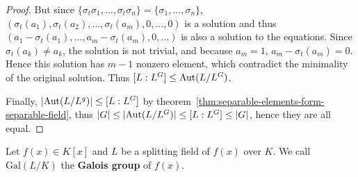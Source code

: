 \begin{theorem}
\begin{proof}
    But since $\{\sigma_t \sigma_1, \dots, \sigma_t \sigma_n\} = \{\sigma_1, \dots, \sigma_n\}$,
    $(\sigma_t(a_1), \sigma_t(a_2), \dots, \sigma_t(a_m), 0, \dots, 0)$ is a solution
    and thus $(a_1 - \sigma_t(a_1), \dots, a_m - \sigma_t(a_m), 0, \dots)$ is also a solution to the equations.
    Since $\sigma_t(a_k) \neq a_k$, the solution is not trivial, and because $a_m = 1$, $a_m - \sigma_t(a_m) = 0$.
    Hence this solution has $m-1$ nonzero element, which contradict the minimality of the original solution.
    Thus $[L: L^G] \leq \operatorname{Aut}(L/L^G)$.

    Finally, $\lvert\operatorname{Aut}(L/L^g)\rvert \leq [L: L^G]$ by theorem~\ref{thm:separable-elements-form-separable-field},
    thus $\lvert G\rvert \leq \lvert\operatorname{Aut}(L/L^G)\rvert \leq [L: L^G] \leq \lvert G\rvert$, hence they are all equal.
  \end{proof}
\end{theorem}

\begin{definition}
  Let $f(x) \in K[x]$ and $L$ be a splitting field of $f(x)$ over $K$. We call $\text{Gal}(L/K)$
  the {\bf Galois group} of $f(x)$.
\end{definition}

